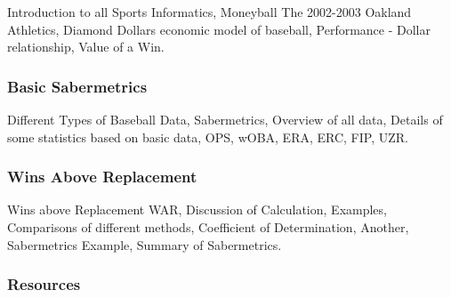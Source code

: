 Introduction to all Sports Informatics, Moneyball The 2002-2003 Oakland
Athletics, Diamond Dollars economic model of baseball, Performance -
Dollar relationship, Value of a Win.




\subsubsection{Basic Sabermetrics}\label{basic-sabermetrics}

Different Types of Baseball Data, Sabermetrics, Overview of all data,
Details of some statistics based on basic data, OPS, wOBA, ERA, ERC,
FIP, UZR.





\subsubsection{Wins Above Replacement}\label{wins-above-replacement}

Wins above Replacement WAR, Discussion of Calculation, Examples,
Comparisons of different methods, Coefficient of Determination, Another,
Sabermetrics Example, Summary of Sabermetrics.





\subsubsection{Resources}\label{resources}

